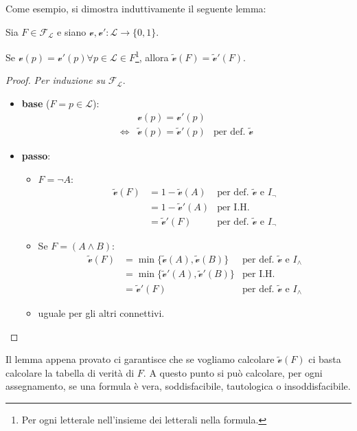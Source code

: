 Come esempio, si dimostra induttivamente il seguente lemma: 
\begin{lem}
Sia $F \in \mathscr{F_L}$ e siano $\mathcal{v}, \mathcal{v}' : \mathscr{L} \rightarrow \{0,1\}$. 

Se $\mathcal{v}(p) = \mathcal{v}'(p) \forall p \in \mathscr{L} \in F$\footnote{Per ogni letterale nell'insieme dei letterali nella formula.}, 
allora $\widetilde{\mathcal{v}}(F) = \widetilde{\mathcal{v}}'(F)$.
\end{lem}
\begin{proof}
  \textit{Per induzione su } $\mathscr{F_L}$.
  \begin{itemize}
    \item \textbf{base} ($F = p \in \mathscr{L}$): 
      \begin{align*}
        & \mathcal{v}(p) = \mathcal{v}'(p) \\
        \iff & \widetilde{\mathcal{v}}(p) = \widetilde{\mathcal{v}}'(p) & \text{per def. }\widetilde{\mathcal{v}}
      \end{align*}
    \item \textbf{passo}:
    \begin{itemize}
      \item $F = \neg A$:
        \begin{align*}
          \widetilde{\mathcal{v}}(F) &= 1 - \widetilde{\mathcal{v}}(A) & \text{per def. } \widetilde{\mathcal{v}} \text{ e } I_\neg \\
          &= 1 - \widetilde{\mathcal{v}}'(A) & \text{per I.H.} \\
          &= \widetilde{\mathcal{v}}'(F) & \text{per def. } \widetilde{\mathcal{v}} \text{ e } I_\neg
        \end{align*}
      \item Se $F = (A \land B)$:
        \begin{align*}
          \widetilde{\mathcal{v}}(F) &= \min\{\widetilde{\mathcal{v}}(A), \widetilde{\mathcal{v}}(B)\} & \text{per def. } \widetilde{\mathcal{v}} \text{ e } I_\land \\
          &= \min\{\widetilde{\mathcal{v}}'(A), \widetilde{\mathcal{v}}'(B)\} & \text{per I.H.} \\
          &= \widetilde{\mathcal{v}}'(F) & \text{per def. } \widetilde{\mathcal{v}} \text{ e } I_\land        
        \end{align*}
      \item uguale per gli altri connettivi.
    \end{itemize}
  \end{itemize}
\end{proof}
Il lemma appena provato ci garantisce che se vogliamo calcolare $\widetilde{\mathcal{v}}(F)$ 
ci basta calcolare la tabella di verità di $F$. A questo punto si può calcolare, 
per ogni assegnamento, se una formula è vera, soddisfacibile, tautologica o 
insoddisfacibile.

